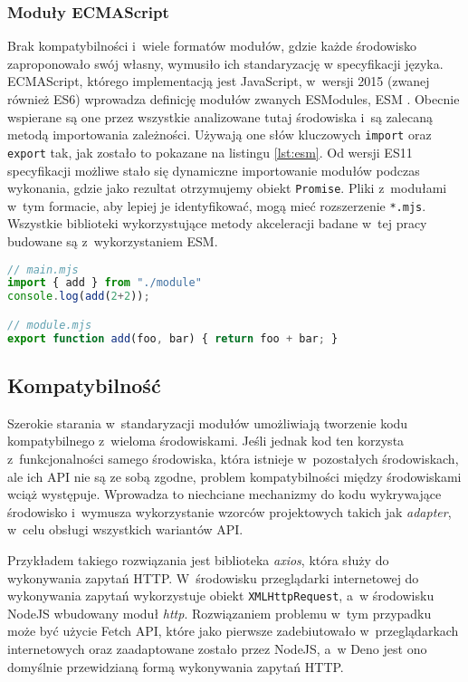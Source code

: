 \subsubsection{Moduły ECMAScript}

Brak kompatybilności i~wiele formatów modułów, gdzie każde środowisko zaproponowało swój własny, wymusiło ich standaryzację w specyfikacji języka. ECMAScript, którego implementacją jest JavaScript, w~wersji 2015 (zwanej również ES6) wprowadza definicję modułów zwanych ESModules, ESM \cite{ESModules}. Obecnie wspierane są one przez wszystkie analizowane tutaj środowiska i~są zalecaną metodą importowania zależności. Używają one słów kluczowych \lstinline{import} oraz \lstinline{export} tak, jak zostało to pokazane na listingu \ref{lst:esm}. Od wersji ES11 specyfikacji możliwe stało się dynamiczne importowanie modułów podczas wykonania, gdzie jako rezultat otrzymujemy obiekt \mbox{\lstinline{Promise}}. Pliki z~modułami w~tym formacie, aby lepiej je identyfikować, mogą mieć rozszerzenie \mbox{\lstinline{*.mjs}}. Wszystkie biblioteki wykorzystujące metody akceleracji badane w~tej pracy budowane są z~wykorzystaniem ESM.

\begin{lstlisting}[language=JavaScript, caption=Przykład wykorzystania ECMAScript Modules, label=lst:esm]
// main.mjs
import { add } from "./module"
console.log(add(2+2));

// module.mjs
export function add(foo, bar) { return foo + bar; }
\end{lstlisting}

\subsection{Kompatybilność}

Szerokie starania w~standaryzacji modułów umożliwiają tworzenie kodu kompatybilnego z~wieloma środowiskami. Jeśli jednak kod ten korzysta z~funkcjonalności samego środowiska, która istnieje w~pozostałych środowiskach, ale ich API nie są ze sobą zgodne, problem kompatybilności między środowiskami wciąż występuje. Wprowadza to niechciane mechanizmy do kodu wykrywające środowisko i~wymusza wykorzystanie wzorców projektowych takich jak \textit{adapter}, w~celu obsługi wszystkich wariantów API.

Przykładem takiego rozwiązania jest biblioteka \textit{axios}, która służy do wykonywania zapytań HTTP. W~środowisku przeglądarki internetowej do wykonywania zapytań wykorzystuje obiekt \lstinline{XMLHttpRequest}, a~w środowisku NodeJS wbudowany moduł \textit{http}. Rozwiązaniem problemu w~tym przypadku może być użycie Fetch API, które jako pierwsze zadebiutowało w~przeglądarkach internetowych oraz zaadaptowane zostało przez NodeJS, a~w Deno jest ono domyślnie przewidzianą formą wykonywania zapytań HTTP.

